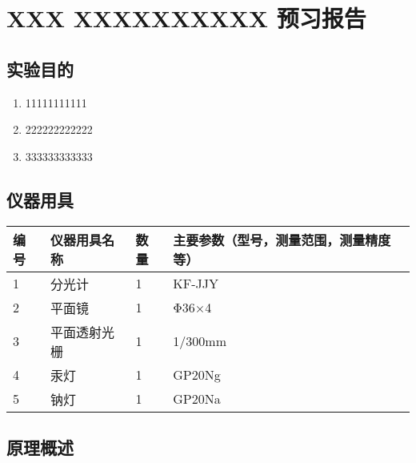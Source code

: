\documentclass[dvipsnames, svgnames,a4paper,11pt]{article}
\begin{document}
\clearpage
\tableofcontents
\clearpage

\setcounter{section}{0}
\section{XXX \quad XXXXXXXXXX \quad\heiti 预习报告}
	
\subsection{实验目的}
\begin{enumerate}
	\item 11111111111
	\item 222222222222
	\item 333333333333
	
\end{enumerate}

\subsection{仪器用具}
\begin{table}[htbp]
	\centering
	\renewcommand\arraystretch{1.6}
	\begin{tabular}{p{}|p{}|p{}|p{}}
	\hline
	编号& 仪器用具名称 & 数量 &  主要参数（型号，测量范围，测量精度等） \\
	\hline
	1&分光计 	&1 	& KF-JJY\\

	2&平面镜 	&1 	& Φ36×4 \\
	
	3&平面透射光栅 & 1 &1/300mm \\
	
	4&汞灯&1 & GP20Ng\\
	
	5&钠灯&1 & GP20Na\\
	\hline
\end{tabular}
\end{table}

\subsection{原理概述}
\end{document}

